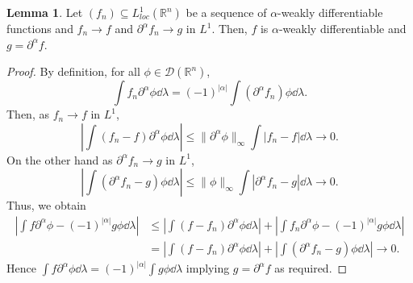 \documentclass[]{article}
\theoremstyle{definition}
\theoremstyle{definition}
\newtheorem{lemma}{Lemma}[section]
\begin{document}
\begin{lemma}
  Let \((f_n) \subseteq L^1_{loc}(\mathbb{R}^n)\) be a sequence of \(\alpha\)-weakly 
  differentiable functions and \(f_n \to f\) and \(\partial^\alpha f_n \to g\) in \(L^1\). 
  Then, \(f\) is \(\alpha\)-weakly differentiable and \(g = \partial^\alpha f\).
\end{lemma}
\begin{proof}
  By definition, for all \(\phi \in \mathcal{D}(\mathbb{R}^n)\), 
  \[\int f_n \partial^\alpha \phi \dd \lambda = (-1)^{|\alpha|} \int (\partial^\alpha f_n)\phi \dd \lambda.\]
  Then, as \(f_n \to f\) in \(L^1\), 
  \[\left|\int(f_n - f) \partial^\alpha \phi \dd \lambda\right| \le \|\partial^\alpha \phi\|_\infty
  \int|f_n - f| \dd \lambda \to 0.\] 
  On the other hand as \(\partial^\alpha f_n \to g\) in \(L^1\),
  \[\left|\int (\partial^\alpha f_n - g)\phi \dd \lambda\right| \le 
    \|\phi\|_\infty\int |\partial^\alpha f_n - g| \dd \lambda \to 0.\]
  Thus, we obtain 
  \[\begin{split}
    \left|\int f\partial^\alpha \phi - (-1)^{|\alpha|} g\phi \dd \lambda\right| & \le 
    \left|\int (f - f_n) \partial^\alpha \phi \dd \lambda \right| + 
    \left|\int f_n \partial^\alpha \phi - (-1)^{|\alpha|} g \phi \dd \lambda\right| \\
    & = \left|\int (f - f_n) \partial^\alpha \phi \dd \lambda \right| + 
    \left|\int (\partial^\alpha f_n - g)\phi \dd \lambda\right| \to 0.
  \end{split}\]
  Hence \(\int f\partial^\alpha \phi \dd \lambda = (-1)^{|\alpha|} \int g\phi \dd \lambda\) 
  implying \(g = \partial^\alpha f\) as required.
\end{proof}
\end{document}
